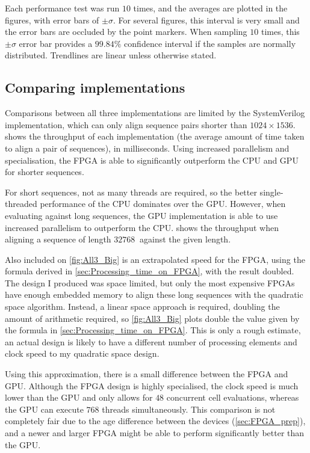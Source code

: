 Each performance test was run $10$ times, and the averages are plotted in the figures, with error bars of $\pm\sigma$.
For several figures, this interval is very small and the error bars are occluded by the point markers.
When sampling $10$ times, this $\pm\sigma$ error bar provides a $99.84\%$ confidence interval if the samples are normally distributed.
Trendlines are linear unless otherwise stated.

\subsection{Comparing implementations}
\label{sec:Comparing_implementations}

Comparisons between all three implementations are limited by the SystemVerilog implementation, which can only align sequence pairs shorter than $1024\times1536$.
 shows the throughput of each implementation (the average amount of time taken to align a pair of sequences), in milliseconds.
Using increased parallelism and specialisation, the FPGA is able to significantly outperform the CPU and GPU for shorter sequences.

For short sequences, not as many threads are required, so the better single-threaded performance of the CPU dominates over the GPU.
However, when evaluating against long sequences, the GPU implementation is able to use increased parallelism to outperform the CPU.
 shows the throughput when aligning a sequence of length $\SI{32768}{}$ against the given length.

Also included on \cref{fig:All3_Big} is an extrapolated speed for the FPGA, using the formula derived in \cref{sec:Processing_time_on_FPGA}, with the result doubled.
The design I produced was space limited, but only the most expensive FPGAs have enough embedded memory to align these long sequences with the quadratic space algorithm.
Instead, a linear space approach is required, doubling the amount of arithmetic required, so \cref{fig:All3_Big} plots double the value given by the formula in \cref{sec:Processing_time_on_FPGA}.
This is only a rough estimate, an actual design is likely to have a different number of processing elements and clock speed to my quadratic space design.

Using this approximation, there is a small difference between the FPGA and GPU.
Although the FPGA design is highly specialised, the clock speed is much lower than the GPU and only allows for $48$ concurrent cell evaluations, whereas the GPU can execute $768$ threads simultaneously.
This comparison is not completely fair due to the age difference between the devices (\cref{sec:FPGA_prep}), and a newer and larger FPGA might be able to perform significantly better than the GPU.


